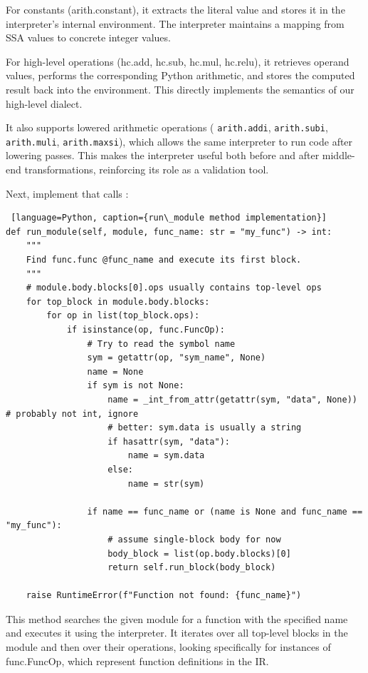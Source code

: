 \documentclass[../main.tex]{subfiles}
\begin{document}
For constants (arith.constant), it extracts the literal value and stores it in the
interpreter’s internal environment. The interpreter maintains a mapping from SSA values
to concrete integer values.

For high-level operations (hc.add, hc.sub, hc.mul, hc.relu), it retrieves operand
values, performs the corresponding
Python arithmetic, and stores the computed result back into the environment.
This directly implements the semantics of our high-level dialect.

It also supports lowered arithmetic operations
(
\texttt{arith.addi},
\texttt{arith.subi}, \texttt{arith.muli}, \texttt{arith.maxsi}),
which allows the same interpreter to run code after lowering passes. This makes the interpreter
useful both before and after middle-end transformations, reinforcing
its role as a validation tool.

Next, implement  that calls :
\begin{lstlisting} [language=Python, caption={run\_module method implementation}]
def run_module(self, module, func_name: str = "my_func") -> int:
    """
    Find func.func @func_name and execute its first block.
    """
    # module.body.blocks[0].ops usually contains top-level ops
    for top_block in module.body.blocks:
        for op in list(top_block.ops):
            if isinstance(op, func.FuncOp):
                # Try to read the symbol name
                sym = getattr(op, "sym_name", None)
                name = None
                if sym is not None:
                    name = _int_from_attr(getattr(sym, "data", None))  # probably not int, ignore
                    # better: sym.data is usually a string
                    if hasattr(sym, "data"):
                        name = sym.data
                    else:
                        name = str(sym)

                if name == func_name or (name is None and func_name == "my_func"):
                    # assume single-block body for now
                    body_block = list(op.body.blocks)[0]
                    return self.run_block(body_block)

    raise RuntimeError(f"Function not found: {func_name}")
\end{lstlisting}
This method searches the given module for a function with the specified name
and executes it using the interpreter. It iterates over all top-level blocks
in the module and then over their operations, looking specifically for
instances of func.FuncOp, which represent function definitions in the IR.
\end{document}
